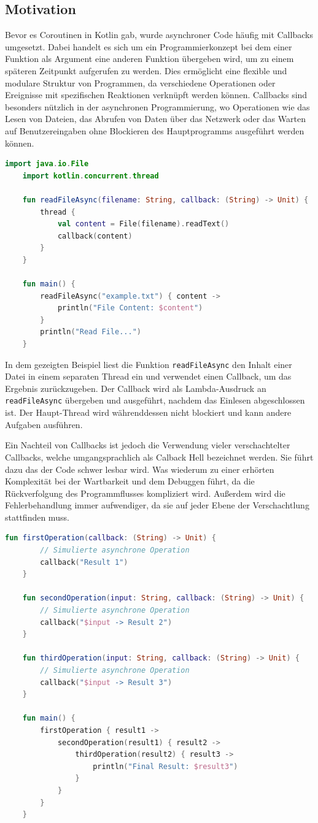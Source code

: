 \documentclass[fontsize=12pt,paper=a4,twoside=semi,parskip=half-,headsepline,headinclude]{scrreprt}
\newcommand{\code}[1]{\texttt{#1}}
\begin{document}
\subsection{Motivation}

Bevor es Coroutinen in Kotlin gab, wurde asynchroner Code häufig mit Callbacks umgesetzt. Dabei handelt es sich um ein Programmierkonzept bei dem einer Funktion als Argument eine anderen Funktion übergeben wird, um zu einem späteren Zeitpunkt aufgerufen zu werden. Dies ermöglicht eine flexible und modulare Struktur von Programmen, da verschiedene Operationen oder Ereignisse mit spezifischen Reaktionen verknüpft werden können. Callbacks sind besonders nützlich in der asynchronen Programmierung, wo Operationen wie das Lesen von Dateien, das Abrufen von Daten über das Netzwerk oder das Warten auf Benutzereingaben ohne Blockieren des Hauptprogramms ausgeführt werden können.

\begin{lstlisting}[language=Kotlin]
	import java.io.File
	import kotlin.concurrent.thread
	
	fun readFileAsync(filename: String, callback: (String) -> Unit) {
		thread {
			val content = File(filename).readText()
			callback(content)
		}
	}
	
	fun main() {
		readFileAsync("example.txt") { content ->
			println("File Content: $content")
		}
		println("Read File...")
	}
\end{lstlisting}

In dem gezeigten Beispiel liest die Funktion \code{readFileAsync} den Inhalt einer Datei in einem separaten Thread ein und verwendet einen Callback, um das Ergebnis zurückzugeben. Der Callback wird als Lambda-Ausdruck an \code{readFileAsync} übergeben und ausgeführt, nachdem das Einlesen abgeschlossen ist. Der Haupt-Thread wird währenddessen nicht blockiert und kann andere Aufgaben ausführen.

Ein Nachteil von Callbacks ist jedoch die Verwendung vieler verschachtelter Callbacks, welche umgangsprachlich als Calback Hell bezeichnet werden. Sie führt dazu das der Code schwer lesbar wird. Was wiederum zu einer erhörten Komplexität bei der Wartbarkeit und dem Debuggen führt, da die Rückverfolgung des Programmflusses kompliziert wird. Außerdem wird die Fehlerbehandlung immer aufwendiger, da sie auf jeder Ebene der Verschachtlung stattfinden muss.

\begin{lstlisting}[language=Kotlin]
	fun firstOperation(callback: (String) -> Unit) {
		// Simulierte asynchrone Operation
		callback("Result 1")
	}
	
	fun secondOperation(input: String, callback: (String) -> Unit) {
		// Simulierte asynchrone Operation
		callback("$input -> Result 2")
	}
	
	fun thirdOperation(input: String, callback: (String) -> Unit) {
		// Simulierte asynchrone Operation
		callback("$input -> Result 3")
	}
	
	fun main() {
		firstOperation { result1 ->
			secondOperation(result1) { result2 ->
				thirdOperation(result2) { result3 ->
					println("Final Result: $result3")
				}
			}
		}
	}
\end{lstlisting}
\end{document}
